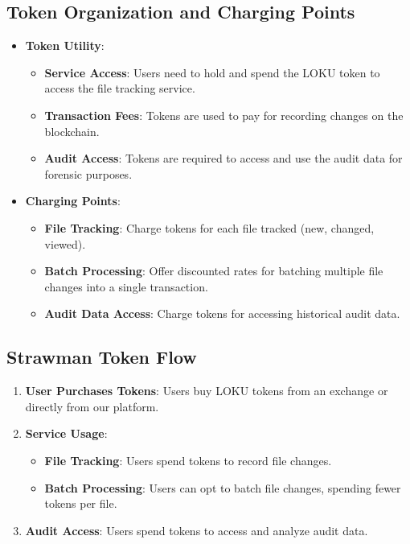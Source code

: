 \documentclass{tufte-handout}
\begin{document}
\subsection*{Token Organization and Charging Points}

\begin{itemize}
    \item \textbf{Token Utility}:
    \begin{itemize}
        \item \textbf{Service Access}: Users need to hold and spend the LOKU token to access the file tracking service.
        \item \textbf{Transaction Fees}: Tokens are used to pay for recording changes on the blockchain.
        \item \textbf{Audit Access}: Tokens are required to access and use the audit data for forensic purposes.
    \end{itemize}
    \item \textbf{Charging Points}:
    \begin{itemize}
        \item \textbf{File Tracking}: Charge tokens for each file tracked (new, changed, viewed).
        \item \textbf{Batch Processing}: Offer discounted rates for batching multiple file changes into a single transaction.
        \item \textbf{Audit Data Access}: Charge tokens for accessing historical audit data.
    \end{itemize}
\end{itemize}

\subsection*{Strawman Token Flow}

\begin{enumerate}
    \item \textbf{User Purchases Tokens}: Users buy LOKU tokens from an exchange or directly from our platform.
    \item \textbf{Service Usage}:
    \begin{itemize}
        \item \textbf{File Tracking}: Users spend tokens to record file changes.
        \item \textbf{Batch Processing}: Users can opt to batch file changes, spending fewer tokens per file.
    \end{itemize}
    \item \textbf{Audit Access}: Users spend tokens to access and analyze audit data.
\end{enumerate}
\end{document}
